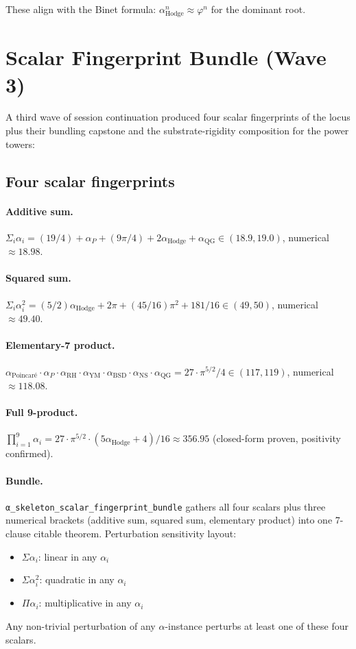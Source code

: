 These align with the Binet formula: $\alpha_{\text{Hodge}}^n \approx
\varphi^n$ for the dominant root.

\section{Scalar Fingerprint Bundle (Wave 3)}
\label{sec:scalar-fingerprints-2026-06-16}

A third wave of session continuation produced four scalar
fingerprints of the locus plus their bundling capstone and the
substrate-rigidity composition for the power towers:

\subsection{Four scalar fingerprints}

\paragraph{Additive sum.} $\Sigma_i \alpha_i
= (19/4) + \alpha_P + (9\pi/4) + 2 \alpha_{\text{Hodge}} + \alpha_{\text{QG}}
\in (18.9, 19.0)$, numerical $\approx 18.98$.

\paragraph{Squared sum.} $\Sigma_i \alpha_i^2
= (5/2) \alpha_{\text{Hodge}} + 2\pi + (45/16) \pi^2 + 181/16
\in (49, 50)$, numerical $\approx 49.40$.

\paragraph{Elementary-7 product.}
$\alpha_{\text{Poincar\'e}} \cdot \alpha_P \cdot \alpha_{\text{RH}}
\cdot \alpha_{\text{YM}} \cdot \alpha_{\text{BSD}} \cdot \alpha_{\text{NS}}
\cdot \alpha_{\text{QG}} = 27 \cdot \pi^{5/2}/4 \in (117, 119)$,
numerical $\approx 118.08$.

\paragraph{Full 9-product.}
$\prod_{i=1}^{9} \alpha_i = 27 \cdot \pi^{5/2}
\cdot (5 \alpha_{\text{Hodge}} + 4)/16 \approx 356.95$ (closed-form
proven, positivity confirmed).

\paragraph{Bundle.} \verb|α_skeleton_scalar_fingerprint_bundle|
gathers all four scalars plus three numerical brackets (additive
sum, squared sum, elementary product) into one 7-clause citable
theorem. Perturbation sensitivity layout:
\begin{itemize}
  \item $\Sigma \alpha_i$: linear in any $\alpha_i$
  \item $\Sigma \alpha_i^2$: quadratic in any $\alpha_i$
  \item $\Pi \alpha_i$: multiplicative in any $\alpha_i$
\end{itemize}
Any non-trivial perturbation of any $\alpha$-instance perturbs at
least one of these four scalars.

